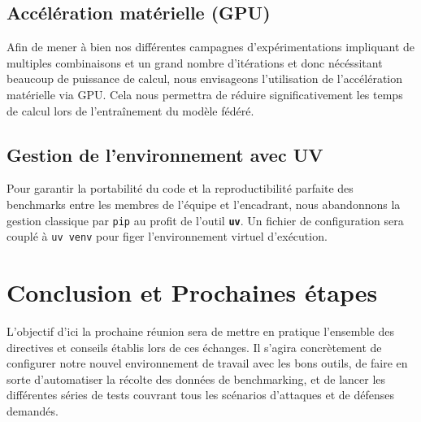 \documentclass[11pt, a4paper]{article}
\begin{document}
\subsection{Accélération matérielle (GPU)}
Afin de mener à bien nos différentes campagnes d'expérimentations impliquant de multiples combinaisons et un grand nombre d'itérations et donc nécéssitant beaucoup de puissance de calcul, nous envisageons l'utilisation de l'accélération matérielle via GPU. Cela nous permettra de réduire significativement les temps de calcul lors de l'entraînement du modèle fédéré.

\subsection{Gestion de l'environnement avec UV}
Pour garantir la portabilité du code et la reproductibilité parfaite des benchmarks entre les membres de l'équipe et l'encadrant, nous abandonnons la gestion classique par \texttt{pip} au profit de l'outil \textbf{\texttt{uv}}. Un fichier de configuration sera couplé à \texttt{uv venv} pour figer l'environnement virtuel d'exécution.

\section{Conclusion et Prochaines étapes}
L'objectif d'ici la prochaine réunion sera de mettre en pratique l'ensemble des directives et conseils établis lors de ces échanges. Il s'agira concrètement de configurer notre nouvel environnement de travail avec les bons outils, de faire en sorte d'automatiser la récolte des données de benchmarking, et de lancer les différentes séries de tests couvrant tous les scénarios d'attaques et de défenses demandés.
\end{document}
